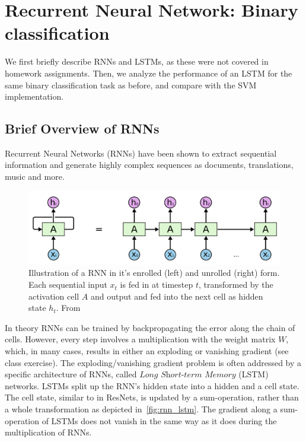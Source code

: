 
\section{Recurrent Neural Network: Binary classification} \label{sec:rnn_clf}

We first briefly describe RNNs and LSTMs, as these were not covered in homework assignments.
Then, we analyze the performance of an LSTM for the same binary classification task as before, and compare with the SVM implementation.

\subsection{Brief Overview of RNNs}

Recurrent Neural Networks (RNNs) have been shown to extract sequential information and generate highly complex sequences as documents, translations, music and more. 

\begin{figure}
	\centering
	\includegraphics [trim=0 0 0 0, clip, angle=0, width=0.8\columnwidth,
	keepaspectratio]{figures/rnn_unrolled}
	\caption{Illustration of a RNN in it's enrolled (left) and unrolled (right) form. Each sequential input $x_t$ is fed in at timestep $t$, transformed by the activation cell $A$ and output and fed into the next cell as hidden state $h_t$. From~\cite{colah_lstm}} 
	\label{fig:rnn_unrolled} 
\end{figure}

In theory RNNs can be trained by backpropagating the error along the chain of cells.
However, every step involves a multiplication with the weight matrix $W$, which, in many cases, results in either an exploding or vanishing gradient (see class exercise).
The exploding/vanishing gradient problem is often addressed by a specific architecture of RNNs, called $\textit{Long Short-term Memory}$ (LSTM) networks.
LSTMs split up the RNN's hidden state into a hidden and a cell state.
The cell state, similar to in ResNets, is updated by a sum-operation, rather than a whole transformation as depicted in~\cref{fig:rnn_lstm}.
The gradient along a sum-operation of LSTMs does not vanish in the same way as it does during the multiplication of RNNs.

